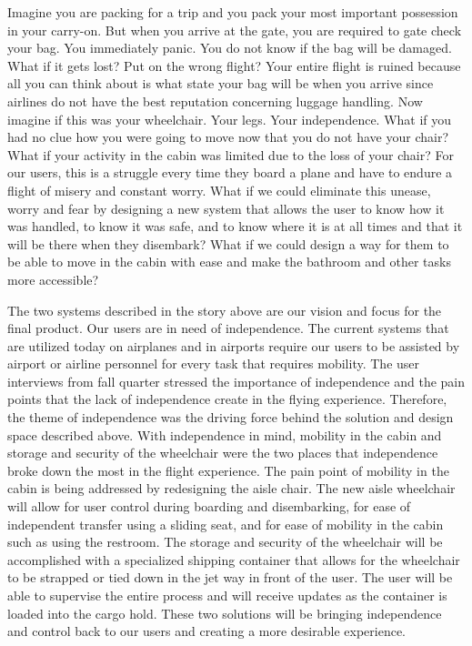 Imagine you are packing for a trip and you pack your most important possession in your carry-on.   But when you arrive at the gate, you are required to gate check your bag.  You immediately panic. You do not know if the bag will be damaged. What if it gets lost? Put on the wrong flight? Your entire flight is ruined because all you can think about is what state your bag will be when you arrive since airlines do not have the best reputation concerning luggage handling.  Now imagine if this was your wheelchair.  Your legs. Your independence. What if you had no clue how you were going to move now that you do not have your chair? What if your activity in the cabin was limited due to the loss of your chair?   For our users, this is a struggle every time they board a plane and have to endure a flight of misery and constant worry.  What if we could eliminate this unease, worry and fear by designing a new system that allows the user to know how it was handled, to know it was safe, and to know where it is at all times and that it will be there when they disembark?  What if we could design a way for them to be able to move in the cabin with ease and make the bathroom and other tasks more accessible? 

The two systems described in the story above are our vision and focus for the final product. Our users are in need of independence.  The current systems that are utilized today on airplanes and in airports require our users to be assisted by airport or airline personnel for every task that requires mobility.  The user interviews from fall quarter stressed the importance of independence and the pain points that the lack of independence create in the flying experience.  Therefore, the theme of independence was the driving force behind the solution and design space described above.  With independence in mind, mobility in the cabin and storage and security of the wheelchair were the two places that independence broke down the most in the flight experience. The pain point of mobility in the cabin is being addressed by redesigning the aisle chair.  The new aisle wheelchair will allow for user control during boarding and disembarking, for ease of independent transfer using a sliding seat, and for ease of mobility in the cabin such as using the restroom. The storage and security of the wheelchair will be accomplished with a specialized shipping container that allows for the wheelchair to be strapped or tied down in the jet way in front of the user. The user will be able to supervise the entire process and will receive updates as the container is loaded into the cargo hold.  These two solutions will be bringing independence and control back to our users and creating a more desirable experience. 

